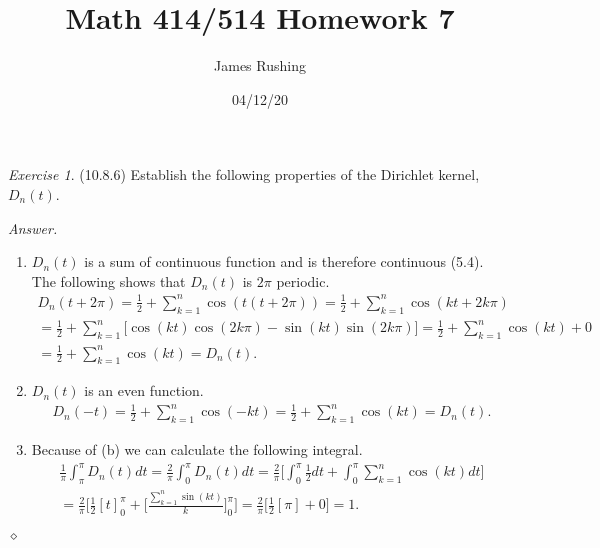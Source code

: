 \documentclass[12pt,oneside]{amsart}
\title{Math 414/514 Homework 7}
\author{James Rushing}
\date{04/12/20}
\theoremstyle{definition}
\theoremstyle{remark}
\newtheorem{exer}{Exercise}
\numberwithin{equation}{exer}
\newenvironment{answer}{\bigskip\noindent\emph{Answer.}}{\hfill$\diamond$\newline}
\newcommand{\smm}{\sum_{k=1}^n}
\begin{document}
\maketitle

\begin{exer} (10.8.6)
\newline \indent 
Establish the following properties of the Dirichlet kernel, $D_n(t)$.
\end{exer}
\begin{answer}

\begin{enumerate}[label=(\alph*)]
\item $D_n(t)$ is a sum of continuous function and is therefore continuous (5.4). The following shows that $D_n(t)$ is $2 \pi$ periodic. 
\begin{align*}
    D_n(t+2 \pi)= \frac{1}{2} + \smm\cos{(t(t+2 \pi))}= \frac{1}{2} + \smm \cos{(kt+2k \pi)}\\
    = \frac{1}{2} + \smm \big[\cos{(kt)}\cos{(2k\pi)} - \sin{(kt)}\sin{(2k\pi)}\big] = \frac{1}{2} + \smm\cos{(kt)} +0\\
    =\frac{1}{2} + \smm\cos{(kt)}=D_n(t).
\end{align*}
\item $D_n(t)$ is an even function.
\begin{align*}
    D_n(-t)= \frac{1}{2} + \smm \cos{(-kt)} = \frac{1}{2} + \smm \cos{(kt)}= D_n(t).
\end{align*}
\item Because of (b) we can calculate the following integral.
\begin{align*}
    \frac{1}{\pi} \int_\pi^\pi D_n(t)dt = \frac{2}{\pi}\int_0^\pi D_n(t)dt
    = \frac{2}{\pi} \bigg[\int_0^\pi \frac{1}{2}dt + \int_0^\pi \smm \cos{(kt)}dt\bigg]\\
    = \frac{2}{\pi}\Bigg[\frac{1}{2} [t]_0^\pi + \bigg[\frac{\smm \sin{(kt)}}{k}\bigg]_0^\pi \Bigg]= \frac{2}{\pi}\bigg[\frac{1}{2} [\pi] +0 \bigg]=1.
\end{align*}


\end{enumerate}
\end{answer}
\end{document}
